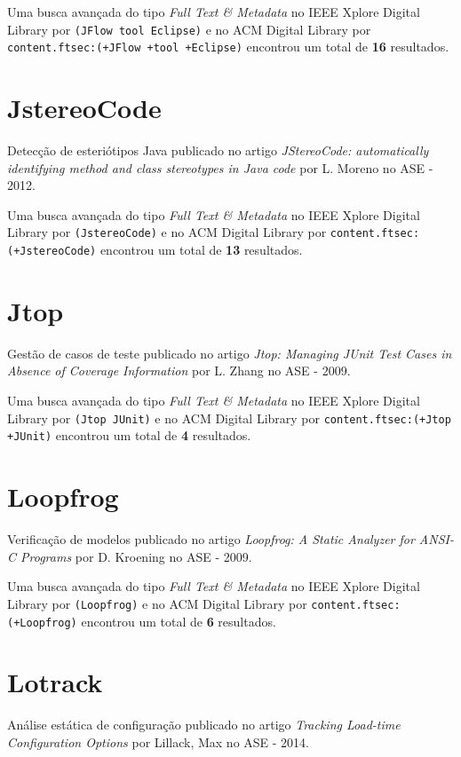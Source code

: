 Uma busca avançada do tipo {\it Full Text \& Metadata} no IEEE Xplore Digital Library por
\texttt{(JFlow tool Eclipse)}
e no ACM Digital Library por
\texttt{content.ftsec:(+JFlow +tool +Eclipse)}
encontrou um total de
{\bf 16}
resultados.

\section{JstereoCode}

Detecção de esteriótipos Java
publicado no artigo
{\it JStereoCode: automatically identifying method and class stereotypes in Java code}
por
L. Moreno
no
ASE
-
2012.


Uma busca avançada do tipo {\it Full Text \& Metadata} no IEEE Xplore Digital Library por
\texttt{(JstereoCode)}
e no ACM Digital Library por
\texttt{content.ftsec:(+JstereoCode)}
encontrou um total de
{\bf 13}
resultados.

\section{Jtop}

Gestão de casos de teste
publicado no artigo
{\it Jtop: Managing JUnit Test Cases in Absence of Coverage Information}
por
L. Zhang
no
ASE
-
2009.


Uma busca avançada do tipo {\it Full Text \& Metadata} no IEEE Xplore Digital Library por
\texttt{(Jtop JUnit)}
e no ACM Digital Library por
\texttt{content.ftsec:(+Jtop +JUnit)}
encontrou um total de
{\bf 4}
resultados.

\section{Loopfrog}

Verificação de modelos
publicado no artigo
{\it Loopfrog: A Static Analyzer for ANSI-C Programs}
por
D. Kroening
no
ASE
-
2009.


Uma busca avançada do tipo {\it Full Text \& Metadata} no IEEE Xplore Digital Library por
\texttt{(Loopfrog)}
e no ACM Digital Library por
\texttt{content.ftsec:(+Loopfrog)}
encontrou um total de
{\bf 6}
resultados.

\section{Lotrack}

Análise estática de configuração
publicado no artigo
{\it Tracking Load-time Configuration Options}
por
Lillack, Max
no
ASE
-
2014.



